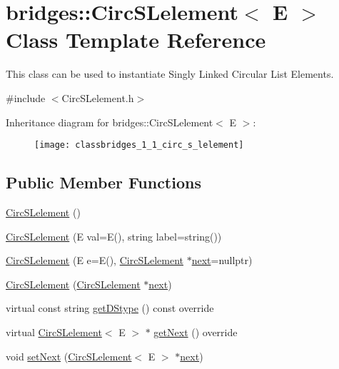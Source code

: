 \hypertarget{classbridges_1_1_circ_s_lelement}{}\section{bridges\+:\+:Circ\+S\+Lelement$<$ E $>$ Class Template Reference}
\label{classbridges_1_1_circ_s_lelement}


This class can be used to instantiate Singly Linked Circular List Elements.  




{\ttfamily \#include $<$Circ\+S\+Lelement.\+h$>$}

Inheritance diagram for bridges\+:\+:Circ\+S\+Lelement$<$ E $>$\+:\begin{figure}[H]
\begin{center}
\leavevmode
\texttt{[image: classbridges\_1\_1\_circ\_s\_lelement]}
\end{center}
\end{figure}
\subsection*{Public Member Functions}
\begin{DoxyCompactItemize}
\item 
\hyperlink{classbridges_1_1_circ_s_lelement_a86183d3487b906550d8f32bda3a68f98}{Circ\+S\+Lelement} ()
\item 
\hyperlink{classbridges_1_1_circ_s_lelement_a765032df6cfaa7cf7589c9e0df29bae4}{Circ\+S\+Lelement} (E val=E(), string label=string())
\item 
\hyperlink{classbridges_1_1_circ_s_lelement_a0dd7605959b4b52de041e9bcbe5abce7}{Circ\+S\+Lelement} (E e=E(), \hyperlink{classbridges_1_1_circ_s_lelement}{Circ\+S\+Lelement} $\ast$\hyperlink{classbridges_1_1_s_lelement_ad7449d10a09ebc52653a7baed812aa43}{next}=nullptr)
\item 
\hyperlink{classbridges_1_1_circ_s_lelement_a1fda146fc0da1d8c7d6440cbbbb2ce42}{Circ\+S\+Lelement} (\hyperlink{classbridges_1_1_circ_s_lelement}{Circ\+S\+Lelement} $\ast$\hyperlink{classbridges_1_1_s_lelement_ad7449d10a09ebc52653a7baed812aa43}{next})
\item 
virtual const string \hyperlink{classbridges_1_1_circ_s_lelement_a4afcf2593c00f2e1161d85ea31d7ae00}{get\+D\+Stype} () const  override
\item 
virtual \hyperlink{classbridges_1_1_circ_s_lelement}{Circ\+S\+Lelement}$<$ E $>$ $\ast$ \hyperlink{classbridges_1_1_circ_s_lelement_aab863627c125c6f1075af7e7b7f340cf}{get\+Next} () override
\item 
void \hyperlink{classbridges_1_1_circ_s_lelement_a7b2512dd1cc559f0a89d9ab4aafed172}{set\+Next} (\hyperlink{classbridges_1_1_circ_s_lelement}{Circ\+S\+Lelement}$<$ E $>$ $\ast$\hyperlink{classbridges_1_1_s_lelement_ad7449d10a09ebc52653a7baed812aa43}{next})
\end{DoxyCompactItemize}
